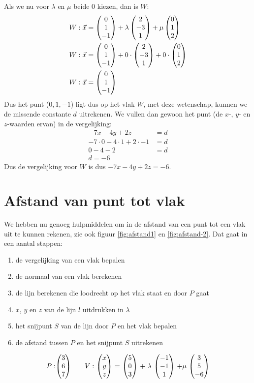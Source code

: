 Als we nu voor $\lambda$ en $\mu$ beide $0$ kiezen, dan is $W$: 
\begin{align*}
  W: \vec{x} &= \begin{pmatrix} 0 \\ 1 \\ -1 \end{pmatrix} + \lambda \begin{pmatrix} 2 \\ -3 \\ 1 \end{pmatrix} + \mu\begin{pmatrix} 0 \\ 1 \\ 2 \end{pmatrix} \\
  W: \vec{x} &= \begin{pmatrix} 0 \\ 1 \\ -1 \end{pmatrix} + 0\cdot\begin{pmatrix} 2 \\ -3 \\ 1 \end{pmatrix} + 0\cdot\begin{pmatrix} 0 \\ 1 \\ 2 \end{pmatrix} \\
  W: \vec{x} &= \begin{pmatrix} 0 \\ 1 \\ -1 \end{pmatrix} 
\end{align*}
Dus het punt ($0,1,-1$) ligt dus op het vlak $W$, met deze wetenschap, kunnen we de missende constante $d$ uitrekenen. We vullen dan gewoon het punt (de $x$-, $y$- en $z$-waarden ervan) in de vergelijking:
\begin{align*}
  -7x-4y+2z &= d \\
  -7\cdot0 - 4\cdot1+2\cdot -1 &= d \\
  0 - 4 - 2 &= d \\ 
  d = -6
\end{align*}
Dus de vergelijking voor $W$ is dus $-7x-4y+2z = -6$. 

\section{Afstand van punt tot vlak}
We hebben nu genoeg hulpmiddelen om in \RD de afstand van een punt tot een vlak uit te kunnen rekenen, zie ook figuur \ref{fig:afstand1} en \ref{fig:afstand-2}. Dat gaat in een aantal stappen:
\begin{enumerate}[label=(\alph*)]
	\item de vergelijking van een vlak bepalen
	\item de normaal van een vlak berekenen
	\item de lijn berekenen die  loodrecht op het vlak staat  en door $P$ gaat
	\item $x$, $y$ en $z$ van de lijn $l$  uitdrukken in $\lambda$
	\item het snijpunt $S$  van de lijn door $P$  en het vlak bepalen
	\item de afstand tussen $P$  en het snijpunt $S$  uitrekenen
\end{enumerate}	


\[P: \vecdrie{3}{6}{7} \quad \quad V:\ \vecdrie{x}{y}{z} \ = \ \vecdrie{5}{0}{3} \ + \ \lambda\ \vecdrie{-1}{-1}{1} \ + \mu\ \vecdrie{3}{5}{-6}\]

